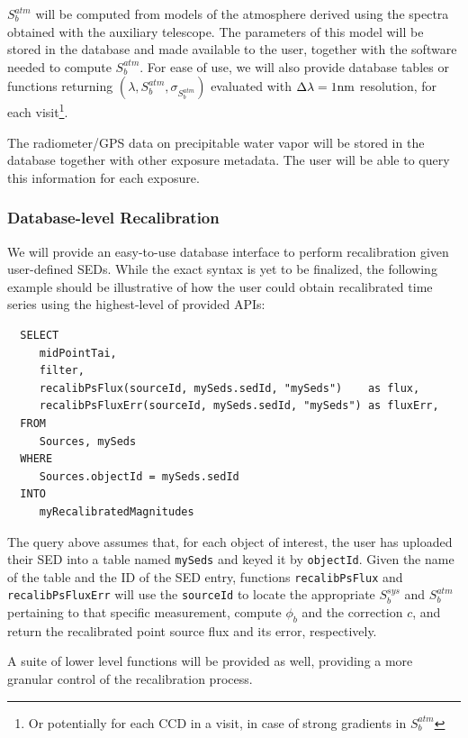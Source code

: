 \documentclass[12pt,preprint]{aastex}
\begin{document}
$S_b^{atm}$ will be computed from models of the atmosphere derived using the spectra obtained with the auxiliary telescope. The parameters of this model will be stored in the database and made available to the user, together with the software needed to compute $S_b^{atm}$. For ease of use, we will also provide database tables or functions returning $(\lambda, S_b^{atm}, \sigma_{S_b^{atm}})$ evaluated with $\Delta\lambda = 1 {\rm nm}$ resolution, for each visit\footnote{Or potentially for each CCD in a visit, in case of strong gradients in $S_b^{atm}$}.

The radiometer/GPS data on precipitable water vapor will be stored in the database together with other exposure metadata. The user will be able to query this information for each exposure.

\subsubsection{Database-level Recalibration}

We will provide an easy-to-use database interface to perform recalibration given user-defined SEDs. While the exact syntax is yet to be finalized, the following example should be illustrative of how the user could obtain recalibrated time series using the highest-level of provided APIs:
%
\begin{verbatim}
  SELECT
     midPointTai,
     filter,
     recalibPsFlux(sourceId, mySeds.sedId, "mySeds")    as flux,
     recalibPsFluxErr(sourceId, mySeds.sedId, "mySeds") as fluxErr,
  FROM
     Sources, mySeds
  WHERE
     Sources.objectId = mySeds.sedId
  INTO
     myRecalibratedMagnitudes
\end{verbatim}
%
The query above assumes that, for each object of interest, the user has uploaded their SED into a table named {\tt mySeds} and keyed it by {\tt objectId}. Given the name of the table and the ID of the SED entry, functions {\tt recalibPsFlux} and {\tt recalibPsFluxErr} will use the {\tt sourceId} to locate the appropriate $S_b^{sys}$ and $S_b^{atm}$ pertaining to that specific measurement, compute $\phi_b$ and the correction $c$, and return the recalibrated point source flux and its error, respectively.

A suite of lower level functions will be provided as well, providing a more granular control of the recalibration process.
\end{document}
